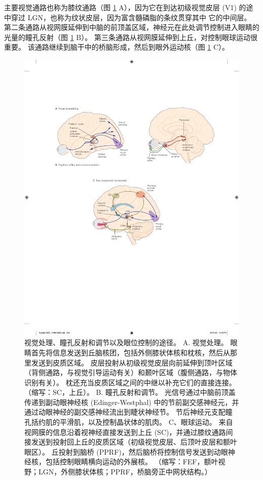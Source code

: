 主要视觉通路也称为膝纹通路（图 \ref{fig:21_6} A），因为它在到达初级视觉皮层 (V1) 的途中穿过 LGN，也称为纹状皮层，因为富含髓磷脂的条纹贯穿其中 它的中间层。 
第二条通路从视网膜延伸到中脑的前顶盖区域，神经元在此处调节控制进入眼睛的光量的瞳孔反射（图 \ref{fig:21_6} B）。 
第三条通路从视网膜延伸到上丘，对控制眼球运动很重要。 
该通路继续到脑干中的桥脑形成，然后到眼外运动核（图 \ref{fig:21_6} C）。

\begin{figure}[htbp]
	\centering
	\includegraphics[width=1.0\linewidth]{chap21/fig_21_6}
	\caption{视觉处理、瞳孔反射和调节以及眼位控制的途径。 
		A. 视觉处理。 
		眼睛首先将信息发送到丘脑核团，包括外侧膝状体核和枕核，然后从那里发送到皮质区域。 
		皮层投射从初级视觉皮层向前延伸到顶叶区域（背侧通路，与视觉引导运动有关）和颞叶区域（腹侧通路，与物体识别有关）。 
		枕还充当皮质区域之间的中继以补充它们的直接连接。 （缩写：SC，上丘）。 
		B. 瞳孔反射和调节。 
		光信号通过中脑前顶盖传递到副动眼神经核 (Edinger-Westphal) 中的节前副交感神经元，并通过动眼神经的副交感神经流出到睫状神经节。 
		节后神经元支配瞳孔括约肌的平滑肌，以及控制晶状体的肌肉。 
		C、眼球运动。 
		来自视网膜的信息沿着视神经直接发送到上丘 (SC)，并通过膝纹通路间接发送到投射回上丘的皮质区域（初级视觉皮层、后顶叶皮层和额叶眼区）。 
		丘投射到脑桥 (PPRF)，然后脑桥将控制信号发送到动眼神经核，包括控制眼睛横向运动的外展核。 （缩写：FEF，额叶视野；LGN，外侧膝状体核；PPRF，桥脑旁正中网状结构。）}
	\label{fig:21_6}
\end{figure}


